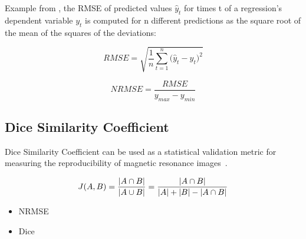 Example from \cite{NRMSE}, the RMSE of predicted values ${\displaystyle {\hat {y}}_{t}}$  for times t of a regression's dependent variable ${\displaystyle y_{t}}$ is computed for n different predictions as the square root of the mean of the squares of the deviations:\\

\begin{center}
  \begin{equation}
     RMSE = {\sqrt {\frac{1} {n}{\sum\limits_{t = 1}^n {(\hat{y}_{t} - {y}_{t} } })^{2} } }
  \end{equation}
\end{center}

\begin{center}
  \begin{equation}
    NRMSE = {\frac{RMSE} {y_{max} - y_{min}}}
  \end{equation}
\end{center}

\subsection{Dice Similarity Coefficient}
Dice Similarity Coefficient can be used as a statistical validation metric for measuring the reproducibility of magnetic resonance images~\cite{Zou2004}. 
\begin{center}
  \begin{equation}
     J(A,B) = {{|A \cap B|}\over{|A \cup B|}} = {{|A \cap B|}\over{|A| + |B| - |A \cap B|}}
  \end{equation}
\end{center}
\begin{itemize}
\item NRMSE
\item Dice
\end{itemize}
